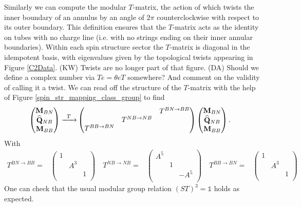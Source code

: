 \documentclass[12pt,a4paper]{article}
\newcounter{arrow}
\newcommand{\unit}{\mathds{1}}
\newcommand{\kw}[1]{{\color{kwcolor}\footnotesize{(KW) #1}}}
\newcommand{\dave}[1]{{\color{ao(english)}\footnotesize{(DA) #1}}}
\begin{document}
Similarly we can compute the modular $T$-matrix, the action of which twists the inner boundary of an annulus by an angle of $2\pi$ counterclockwise with respect to its outer boundary. 
This definition ensures that the $T$-matrix acts as the identity on tubes with no charge line 
(i.e. with no strings ending on their inner annular boundaries).
Within each spin structure sector the $T$-matrix is diagonal in the idempotent basis, 
with eigenvalues given by the topological twists appearing in Figure \ref{C2Data}. 
\kw{Twists are no longer part of that figure.}
\dave{Should we define a complex number via $T e = \theta eT$ somewhere?
And comment on the validity of calling it a twist.
}
We can read off the structure of the $T$-matrix with the help of Figure \ref{spin_str_mapping_class_group} to find
\begin{align}
\left( \begin{matrix}
{\bf M}_{BN}\\
\widehat{{\bf Q} }_{NB}\\
{\bf M}_{BB}\\
\end{matrix} \right)
\xrightarrow{\;\; T \; \; } & \left( \begin{matrix}
&&T^{BN \rightarrow BB}\\
&T^{NB \rightarrow NB}&\\
T^{BB \rightarrow BN}&&\\
\end{matrix} \right)
\left( \begin{matrix}
{\bf M}_{BN}\\
\widehat{{\bf Q} }_{NB}\\
{\bf M}_{BB}\\
\end{matrix} \right).
\end{align}
With 
\begin{align}
T^{BN \rightarrow BB} =  & \left( \begin{matrix}
1&&\\
&A^3&\\
&&1\\
\end{matrix} \right)
\quad 
T^{NB \rightarrow NB}=  & \left( \begin{matrix}
A^5&&\\
&1&\\
&&-A^5\\
\end{matrix} \right)
\quad 
T^{BB \rightarrow BN}=  & \left( \begin{matrix}
1&&\\
&A^3&\\
&&1\\
\end{matrix} \right)
\end{align}
One can check that the usual modular group relation $(ST)^3 = \unit$ holds as expected. 
\end{document}
